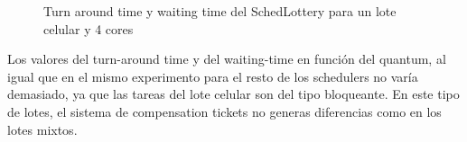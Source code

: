 \begin{figure}
\hfill
{}
\hfill
{}
\hfill
\caption{Turn around time y waiting time del SchedLottery para un lote celular y 4 cores}
\end{figure}

Los valores del turn-around time y del waiting-time en función del quantum, al igual que en el mismo experimento para el resto de los schedulers no varía demasiado, ya que 
las tareas del lote celular son del tipo bloqueante. En este tipo de lotes, el sistema de compensation tickets no generas diferencias como en los lotes mixtos.

